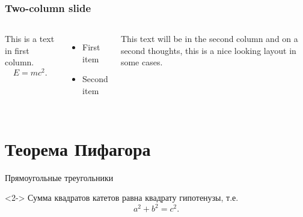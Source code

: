 \documentclass{../cmcbeamer}
\begin{document}
\begin{frame}
\frametitle{Two-column slide}
\begin{columns}

  This is a text in first column.
  \[
    E=mc^{2}.
  \]

  \begin{itemize}
  \item First item
  \item Second item
  \end{itemize}

  This text will be in the second column and on a second thoughts,
  this is a nice looking layout in some cases.
\end{columns}
\end{frame}

\section{Теорема Пифагора}\label{sec:thm-pif}

\begin{frame}{Прямоугольные треугольники}
    \begin{theorem}<2->
      Сумма квадратов катетов равна квадрату гипотенузы, т.е.
      \begin{equation}
        \label{eq:thm-pif}
        a^2+b^2=c^2.
      \end{equation}
    \end{theorem}
\end{frame}
\end{document}
